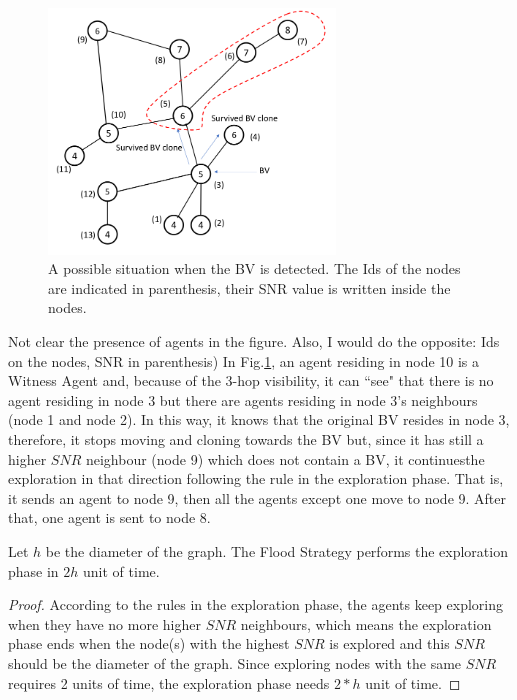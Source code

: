 \begin{figure}[H]
  \centering  
  \includegraphics[width=3in]{figures/Arbi3.png}
  \caption{A possible situation when the BV is detected. The Ids of the nodes are indicated in parenthesis, their SNR value is written inside the nodes.}\label{fig:Arbi3}
\end{figure}    

\color{blue}
Not clear the presence of agents in the figure. Also, I would do the opposite: Ids on the nodes, SNR in parenthesis)
\color{black}
In Fig.\ref{fig:Arbi3}, an agent residing in node 10 is a Witness Agent and, because of the 3-hop visibility, it can ``see" that there is no agent residing in node 3 but there are agents residing in node 3's neighbours  (node 1 and node 2). In this way, it knows that the original BV resides in node 3, therefore, it stops moving and cloning towards the BV but,  since it has still   a higher $SNR$ neighbour (node 9) which does not contain a BV,   it continuesthe exploration in that direction following the rule in the exploration phase. That is, it sends an agent to node 9, then all the agents except one move to node 9. After that, one agent is sent to node 8. 

\begin{theorem}
Let $h$ be  the diameter of the graph. The Flood Strategy performs the exploration phase in  $2h$ unit of time.
\end{theorem}
\begin{proof}
According to the rules in the exploration phase, the agents keep exploring when they have no more higher $SNR$ neighbours, which means the exploration phase ends when the node(s) with the highest $SNR$ is explored and this $SNR$ should be the diameter of the graph. Since exploring nodes with the same $SNR$ requires 2 units of time, the exploration phase needs $2*h$ unit of time.
\end{proof}


